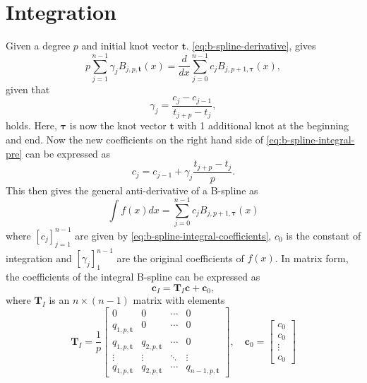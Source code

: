 \section{Integration}
Given a degree $p$ and initial knot vector $\mathbf t$. \cref{eq:b-spline-derivative}, gives
\begin{equation}\label{eq:b-spline-integral-pre}
    p \sum_{j=1}^{n-1} \gamma_j B_{j, p, \boldsymbol{t}}(x) 
    = \frac{d}{dx} \sum_{j=0}^{n-1} c_j B_{j, p+1, \boldsymbol{\tau}}(x),
\end{equation}
given that
\begin{equation}
    \gamma_j = \frac{c_j-c_{j-1}}{t_{j+p}-t_j},
\end{equation}
holds. Here, $\boldsymbol{\tau}$ is now the knot vector $\mathbf{t}$ with 1 additional knot at the beginning and end. Now
the new coefficients on the right hand side of \cref{eq:b-spline-integral-pre} can be expressed as 
\begin{equation}\label{eq:b-spline-integral-coefficients}
    c_j = c_{j-1} + \gamma_j \frac{t_{j+p}-t_j}{p}.
\end{equation}
This then gives the general anti-derivative of a B-spline as
\begin{equation}\label{eq:b-spline-integral}
    \int f(x) dx = \sum_{j=0}^{n-1} c_j B_{j, p+1, \boldsymbol{\tau}}(x)
\end{equation}
where $[c_j]_{j=1}^{n-1}$ are given by \cref{eq:b-spline-integral-coefficients}, $c_0$ is the constant of integration and $[\gamma_j]_1^{n-1}$ are the original coefficients of $f(x)$. In matrix form, the coefficients of the integral B-spline can be expressed as
\begin{equation}\label{eq:b-spline-integral-matrix}
    \mathbf{c}_I = \mathbf T_I \mathbf{c} + \mathbf{c}_0,
\end{equation}
where $\mathbf T_I$ is an $n \times (n-1)$ matrix with elements
\begin{equation}
    \mathbf T_I = \frac{1}{p}\begin{bmatrix}
        0 & 0 & \cdots & 0 \\
        q_{1,p,\mathbf{t}} & 0 & \cdots & 0 \\
        q_{1,p,\mathbf{t}} & q_{2,p,\mathbf{t}} & \cdots & 0 \\
        \vdots & \vdots & \ddots & \vdots \\
        q_{1,p,\mathbf{t}} & q_{2,p,\mathbf{t}} & \cdots & q_{n-1,p,\mathbf{t}}
    \end{bmatrix},\quad
    \mathbf{c}_0 = \begin{bmatrix}
        c_0 \\
        c_0 \\
        \vdots \\
        c_0
    \end{bmatrix}
\end{equation}

